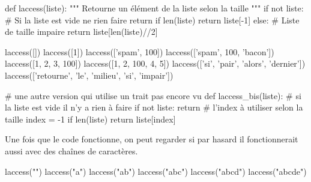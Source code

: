 \begin{solution}
\begin{idleconsole}
\begin{pyconsole}
def laccess(liste):
    """
    Retourne un élément de la liste selon la taille
    """
    if not liste: # Si la liste est vide ne rien faire
        return
    if len(liste) %
        return liste[-1]
    else:                   # Liste de taille impaire
        return liste[len(liste)//2]

laccess([])
laccess([1])
laccess(['spam', 100])
laccess(['spam', 100, 'bacon'])
laccess([1, 2, 3, 100])
laccess([1, 2, 100, 4, 5])
laccess(['si', 'pair', 'alors', 'dernier'])
laccess(['retourne', 'le', 'milieu', 'si', 'impair'])

# une autre version qui utilise un trait pas encore vu
def laccess_bis(liste):
    # si la liste est vide il n'y a rien à faire
    if not liste:
        return
    # l'index à utiliser selon la taille
    index = -1 if len(liste) %
    return liste[index]

\end{pyconsole}
\end{idleconsole}


Une fois que le code fonctionne, on peut regarder si par hasard il fonctionnerait aussi avec des chaînes de caractères.

\begin{idleconsole}
\begin{pyconsole}
laccess("")
laccess("a")
laccess("ab")
laccess("abc")
laccess("abcd")
laccess("abcde")
\end{pyconsole}
\end{idleconsole}
\end{solution}

